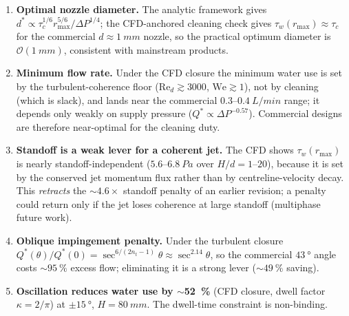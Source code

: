 \documentclass[aps,prfluids,reprint,amsmath,amssymb,floatfix]{revtex4-2}
\newcommand{\Rey}{\mathrm{Re}}
\newcommand{\We}{\mathrm{We}}
\newcommand{\order}[1]{\mathcal{O}\!\left(#1\right)}
\begin{document}
\begin{enumerate}[leftmargin=*, itemsep=4pt]
  \item \textbf{Optimal nozzle diameter.}
  The analytic framework gives
  $d^* \propto \tau_c^{1/6} r_\mathrm{max}^{5/6}/\Delta P^{1/4}$; the
  CFD-anchored cleaning check gives $\tau_w(r_\mathrm{max}) \approx \tau_c$
  for the commercial $d \approx \SI{1}{mm}$ nozzle, so the practical optimum
  diameter is $\order{\SI{1}{mm}}$, consistent with mainstream products.

  \item \textbf{Minimum flow rate.}
  Under the CFD closure the minimum water use is set by the
  turbulent-coherence floor ($\Rey_d \gtrsim 3000$, $\We \gtrsim 1$), not by
  cleaning (which is slack), and lands near the commercial
  $0.3$--$\SI{0.4}{L/min}$ range; it depends only weakly on supply pressure
  ($Q^* \propto \Delta P^{-0.57}$). Commercial designs are therefore
  near-optimal for the cleaning duty.

  \item \textbf{Standoff is a weak lever for a coherent jet.} The CFD shows
  $\tau_w(r_\mathrm{max})$ is nearly standoff-independent
  ($5.6$--$\SI{6.8}{Pa}$ over $H/d = 1$--$20$), because it is set by the
  conserved jet momentum flux rather than by centreline-velocity decay. This
  \emph{retracts} the $\sim 4.6\times$ standoff penalty of an earlier
  revision; a penalty could return only if the jet loses coherence at large
  standoff (multiphase future work).

  \item \textbf{Oblique impingement penalty.}
  Under the turbulent closure $Q^*(\theta)/Q^*(0) = \sec^{6/(2n_t-1)}\theta
  \approx \sec^{2.14}\theta$, so the commercial $\SI{43}{\degree}$ angle costs
  $\sim\SI{95}{\percent}$ excess flow; eliminating it is a strong lever
  ($\sim\SI{49}{\percent}$ saving).

  \item \textbf{Oscillation reduces water use by $\sim$\SI{52}{\percent}}
  (CFD closure, dwell factor $\kappa = 2/\pi$) at $\pm\SI{15}{\degree}$,
  $H = \SI{80}{mm}$. The dwell-time constraint is non-binding.
\end{enumerate}
\end{document}
